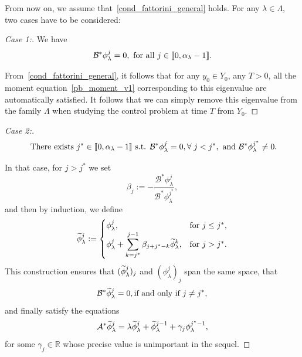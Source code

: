 \documentclass[AHL,Unicode,longabstracts]{cedram}
\newenvironment{step}[1]{\begin{proof}[#1]}{\let\qed\relax\end{proof}}
\newcommand{\llbracket}{\mathopen{[\mkern -2.7mu[}}
\newcommand{\rrbracket}{\mathclose{]\mkern -2.7mu]}}
\newcommand{\inter}[2]{\llbracket #1,#2 \rrbracket}
\newcommand\As{\mathcal{A}^*}
\newcommand\Bs{\mathcal{B}^*}
\newcommand{\Fzp}{Y_0}
\newcommand{\R}{\mathbb{R}}
\let\oldtilde\tilde
\renewcommand*{\tilde}[1]{\mathchoice{\widetilde{#1}}{\widetilde{#1}}{\oldtilde{#1}}{\oldtilde{#1}}}\let\oldexists\exists
\renewcommand*{\exists}{\mathrel{\oldexists}}
\let\oldforall\forall
\renewcommand*{\forall}{\mathrel{\oldforall}}
\begin{document}
From now on, we assume that~\eqref{cond_fattorini_general} holds. For any $\lambda\in \Lambda$, two cases have to be considered:
\begin{step}{Case 1:}
We have
\begin{equation*}\label{AC_case1}
\Bs \phi_\lambda^j=0, \ \text{for all }j\in \inter{0}{\alpha_\lambda-1}.
\end{equation*}

From~\eqref{cond_fattorini_general}, it follows that for any $y_0\in \Fzp$, any $T>0$, all the moment equation~\eqref{pb_moment_v1} corresponding to this eigenvalue are automatically satisfied. It follows that we can simply remove this eigenvalue from the family $\Lambda$ when studying the control problem at time $T$ from $\Fzp$.
\end{step}
\begin{step}{Case 2:}
\begin{equation}\label{AC_case2}
\text{ There exists } j^*\in \inter{0}{\alpha_\lambda-1} \text{ s.t. } \Bs \phi_\lambda^j=0, \forall j< j^*, \ \text{and} \ \Bs \phi_\lambda^{j^*}\neq 0.
\end{equation}

In that case, for $j>j^*$ we set
\[
\beta_j:=-\frac{\Bs \phi_\lambda^j}{\Bs \phi_\lambda^{j^*}},
\]
and then by induction, we define
\begin{equation}\label{def_phi_tilde}
\tilde{\phi}_\lambda^j :=
\begin{cases} \phi_\lambda^j,& \text{for }j\leq j^*,\\
\displaystyle \phi_\lambda^j + \sum_{k=j^*}^{j-1} \beta_{j+j^*-k} \tilde{\phi}_\lambda^k,& \text{for }j>j^*.
\end{cases}
\end{equation}
This construction ensures that $(\tilde{\phi}_\lambda^j)_j$ and $(\phi_\lambda^j)_j$ span the same space, that
\begin{equation}\label{observabilite_generale}
\Bs \tilde{\phi}_\lambda^j=0, \text{if and only if $j\neq j^*$,}
\end{equation}
and finally satisfy the equations
\[
\As \tilde{\phi}_\lambda^j = \lambda \tilde{\phi}_\lambda^j + \tilde{\phi}_\lambda^{j-1} + \gamma_j \phi_\lambda ^{j^*-1},
\]
for some $\gamma_j\in \R$ whose precise value is unimportant in the sequel.


\end{step}
\end{document}
